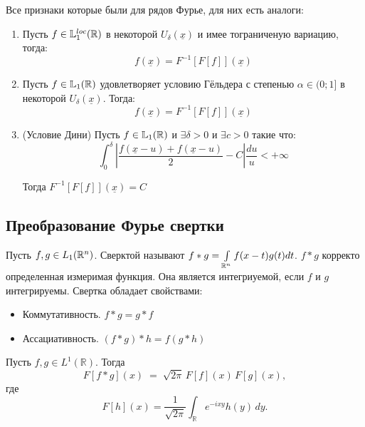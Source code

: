 \begin{corollary}
Все признаки которые были для рядов Фурье, для них есть аналоги:
\begin{enumerate}
    \item Пусть $f \in \mathbb{L}^{loc}_1(\mathbb{R})$ в некоторой $U_\delta(\underline{x})$ и имее тограниченую вариацию, тогда:
    \[
    f(\underline{x}) = F^{-1} [F[f]] (\underline{x})
    \]
    \item Пусть $f \in \mathbb{L}_1(\mathbb{R})$ удовлетворяет условию Гёльдера с степенью $\alpha \in (0; 1]$ в некоторой $U_\delta(\underline{x})$. Тогда:
        \[
    f(\underline{x}) = F^{-1} [F[f]] (\underline{x})
    \]
    \item (Условие Дини) Пусть $f \in  \mathbb{L}_1(\mathbb{R})$ и $\exists \delta > 0$ и $\exists c > 0$ такие что:
    \[
    \int_0^\delta | \frac{f(\underline{x} - u)+f(\underline{x} - u)}{2} - C |  \frac{du}{u} < +\infty \]

    Тогда $F^{-1} [F[f]] (\underline{x}) = C$

\end{enumerate}
\end{corollary}
\subsection{Преобразование Фурье свертки}
\begin{reminder}
    Пусть $f, g \in L_1(\mathbb{R}^n)$. Сверктой называют $f * g = \int\limits_{\mathbb{R}^n} f(x-t)g(t)dt$. $f*g$ корректо определенная измеримая функция. Она является интегриуемой, если $f$ и $g$ интегрируемы. Свертка обладает свойствами:
    \begin{itemize}
        \item Коммутативность. $f*g = g*f$
        \item Ассациативность. $(f*g)*h = f(g*h)$
    \end{itemize}
\end{reminder}

\begin{theorem}
Пусть $f,g\in L^1(\mathbb R)$. Тогда
\[
 F[f * g](x) \;=\;\sqrt{2\pi}\, F[f](x)\,   F[g](x),
\]
где
\[
 F[h](x)=\frac1{\sqrt{2\pi}}\int_{\mathbb R}e^{-i x y}h(y)\,dy.
\]
\end{theorem}

